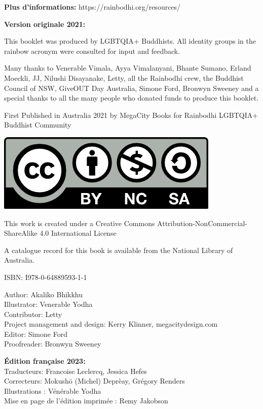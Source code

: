 \documentclass[12pt,openany]{book}
\begin{document}
\newpage
\textbf{Plus d'informations: }https://rainbodhi.org/resources/

\medskip

{\footnotesize
\begin{center}
\noindent \textbf{Version originale 2021:} 

This booklet was produced by \mbox{LGBTQIA+} Buddhists. All identity groups in the rainbow acronym were consulted for input and feedback.

\noindent Many thanks to Venerable Vimala, Ayya Vimalanyani, Bhante Sumano, Erland Moeckli, JJ, Nilushi Disayanake, Letty, all the Rainbodhi crew, the Buddhist Council of NSW, GiveOUT Day Australia, Simone Ford, Bronwyn Sweeney and a special thanks to all the many people who donated funds to produce this booklet.

\medskip

\noindent First Published in Australia 2021 by MegaCity Books for Rainbodhi \mbox{LGBTQIA+} Buddhist Community

\smallskip

\includegraphics{by-nc-sa}

\noindent This work is created under a Creative Commons Attribution-NonCommercial-ShareAlike 4.0 International License

\noindent A catalogue record for this book is available from the National Library of Australia.

\medskip

\noindent ISBN: I978-0-64889593-1-1

\medskip

Author: Akaliko Bhikkhu \\
Illustrator: Venerable Yodha \\
Contributor: Letty \\
Project management and design: Kerry Klinner, megacitydesign.com \\
Editor: Simone Ford \\
Proofreader: Bronwyn Sweeney

\bigskip

\textbf{Édition française 2023:}  \\
Traducteurs: Francoise Leclercq, Jessica Hefes \\
Correcteurs: Mokushō (Michel) Deprèay, Grégory Renders \\
Illustrations : Vénérable Yodha \\
Mise en page de l'édition imprimée : Remy Jakobson
\end{center}
}
\end{document}
